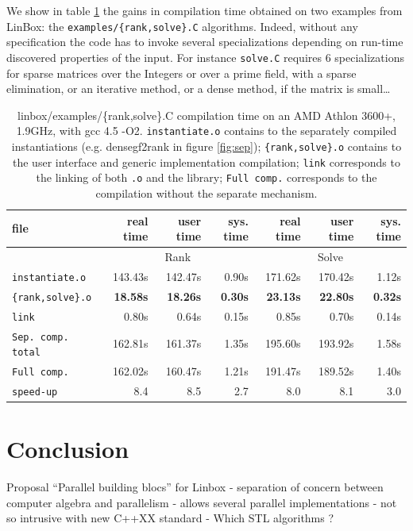 \documentclass{article}
\newcommand{\linbox}{{\sc LinBox}\xspace}
\begin{document}
We show in table \ref{tab:compilation} the gains in compilation time
obtained on two examples from \linbox: the \texttt{examples/\{rank,solve\}.C} algorithms. 
 Indeed, without any specification
 the code has to invoke several specializations depending on
 run-time discovered properties of the input. For instance
 \texttt{solve.C} requires 6 specializations for sparse
 matrices over the Integers or over a prime field, with a sparse
 elimination, or an iterative method, or a dense method, if the matrix
 is small\ldots
\begin{table}[ht]\center
\begin{tabular}{|l||r|r|r||r|r|r|}
\hline
file                      &  real time   &  user time   &  sys. time  &  real time   &  user time   &  sys. time \\
\hline
 & \multicolumn{3}{|c||}{Rank}& \multicolumn{3}{|c|}{Solve}\\
\hline
\texttt{instantiate.o} & 143.43s & 142.47s & 0.90s & 171.62s & 170.42s & 1.12s\\
\texttt{\{rank,solve\}.o} & \bf 18.58s & \bf 18.26s & \bf 0.30s & \bf 23.13s & \bf 22.80s & \bf 0.32s\\
\texttt{link} & 0.80s & 0.64s & 0.15s & 0.85s & 0.70s & 0.14s\\
\hline
\texttt{Sep. comp. total} & 162.81s & 161.37s & 1.35s & 195.60s & 193.92s & 1.58s\\
\hline
\texttt{Full comp.} & 162.02s & 160.47s & 1.21s & 191.47s & 189.52s & 1.40s\\
\hline
\hline
\texttt{speed-up} & 8.4 & 8.5 & 2.7 & 8.0 & 8.1 & 3.0\\
\hline
\end{tabular} 
\caption{linbox/examples/\{rank,solve\}.C compilation time on an AMD
  Athlon 3600+, 1.9GHz, with gcc 4.5 -O2. \texttt{instantiate.o} contains to the separately compiled
  instantiations (e.g. densegf2rank in figure \ref{fig:sep});
  \texttt{\{rank,solve\}.o} contains to the user interface and generic
  implementation compilation; \texttt{link} corresponds to the linking
  of both \texttt{.o} and the library; \texttt{Full comp.} corresponds
  to the compilation without the separate
  mechanism.}\label{tab:compilation}
\end{table}

\section{Conclusion}

Proposal ``Parallel building blocs'' for Linbox
- separation of concern between computer algebra and parallelism
- allows several parallel implementations
- not so intrusive with new C++XX standard
- Which STL algorithms ?
\end{document}
